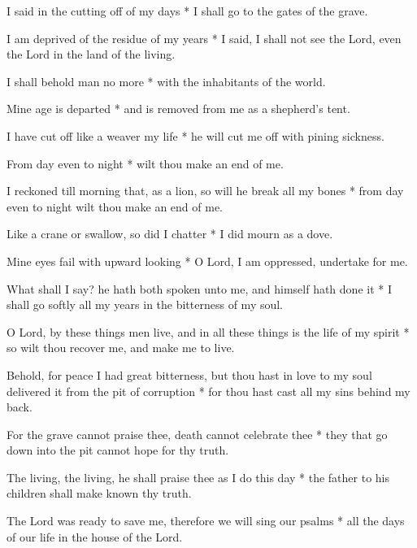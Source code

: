 I said in the cutting off of my days * I shall go to the gates of the grave.

I am deprived of the residue of my years * I said, I shall not see the Lord, even the Lord in the land of the living.

I shall behold man no more * with the inhabitants of the world.

Mine age is departed * and is removed from me as a shepherd's tent.

I have cut off like a weaver my life * he will cut me off with pining sickness.

From day even to night * wilt thou make an end of me.

I reckoned till morning that, as a lion, so will he break all my bones * from day even to night wilt thou make an end of me.

Like a crane or swallow, so did I chatter * I did mourn as a dove.

Mine eyes fail with upward looking * O Lord, I am oppressed, undertake for me.

What shall I say? he hath both spoken unto me, and himself hath done it * I shall go softly all my years in the bitterness of my soul.

O Lord, by these things men live, and in all these things is the life of my spirit * so wilt thou recover me, and make me to live.

Behold, for peace I had great bitterness, but thou hast in love to my soul delivered it from the pit of corruption * for thou hast cast all my sins behind my back.

For the grave cannot praise thee, death cannot celebrate thee * they that go down into the pit cannot hope for thy truth.

The living, the living, he shall praise thee as I do this day * the father to his children shall make known thy truth.

The Lord was ready to save me, therefore we will sing our psalms * all the days of our life in the house of the Lord.